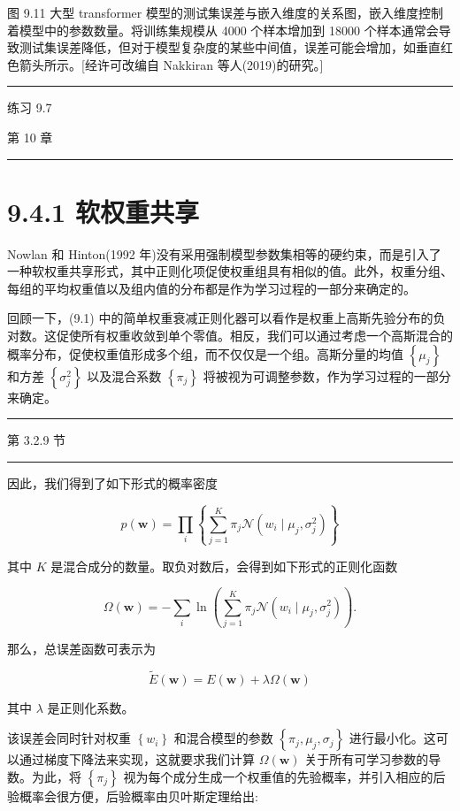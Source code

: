 \documentclass[10pt]{report}
\newcommand{\HRule}{\begin{center}\rule{0.9\linewidth}{0.2mm}\end{center}}
\begin{document}
图 9.11 大型 transformer 模型的测试集误差与嵌入维度的关系图，嵌入维度控制着模型中的参数数量。将训练集规模从 4000 个样本增加到 18000 个样本通常会导致测试集误差降低，但对于模型复杂度的某些中间值，误差可能会增加，如垂直红色箭头所示。[经许可改编自 Nakkiran 等人(2019)的研究。]

\HRule

练习 9.7

第 10 章

\HRule

\section*{9.4.1 软权重共享}

Nowlan 和 Hinton(1992 年)没有采用强制模型参数集相等的硬约束，而是引入了一种软权重共享形式，其中正则化项促使权重组具有相似的值。此外，权重分组、每组的平均权重值以及组内值的分布都是作为学习过程的一部分来确定的。

回顾一下，(9.1) 中的简单权重衰减正则化器可以看作是权重上高斯先验分布的负对数。这促使所有权重收敛到单个零值。相反，我们可以通过考虑一个高斯混合的概率分布，促使权重值形成多个组，而不仅仅是一个组。高斯分量的均值 \(\left\{  {\mu }_{j}\right\}\) 和方差 \(\left\{  {\sigma }_{j}^{2}\right\}\) 以及混合系数 \(\left\{  {\pi }_{j}\right\}\) 将被视为可调整参数，作为学习过程的一部分来确定。

\HRule

第 3.2.9 节

\HRule

因此，我们得到了如下形式的概率密度

\[
p\left( \mathbf{w}\right)  = \mathop{\prod }\limits_{i}\left\{  {\mathop{\sum }\limits_{{j = 1}}^{K}{\pi }_{j}\mathcal{N}\left( {{w}_{i} \mid  {\mu }_{j},{\sigma }_{j}^{2}}\right) }\right\}   \tag{9.21}
\]

其中 \(K\) 是混合成分的数量。取负对数后，会得到如下形式的正则化函数

\[
\Omega \left( \mathbf{w}\right)  =  - \mathop{\sum }\limits_{i}\ln \left( {\mathop{\sum }\limits_{{j = 1}}^{K}{\pi }_{j}\mathcal{N}\left( {{w}_{i} \mid  {\mu }_{j},{\sigma }_{j}^{2}}\right) }\right) . \tag{9.22}
\]

那么，总误差函数可表示为

\[
\widetilde{E}\left( \mathbf{w}\right)  = E\left( \mathbf{w}\right)  + {\lambda \Omega }\left( \mathbf{w}\right)  \tag{9.23}
\]

其中 \(\lambda\) 是正则化系数。

该误差会同时针对权重 \(\left\{  {w}_{i}\right\}\) 和混合模型的参数 \(\left\{  {{\pi }_{j},{\mu }_{j},{\sigma }_{j}}\right\}\) 进行最小化。这可以通过梯度下降法来实现，这就要求我们计算 \(\Omega \left( \mathbf{w}\right)\) 关于所有可学习参数的导数。为此，将 \(\left\{  {\pi }_{j}\right\}\) 视为每个成分生成一个权重值的先验概率，并引入相应的后验概率会很方便，后验概率由贝叶斯定理给出:
\end{document}
